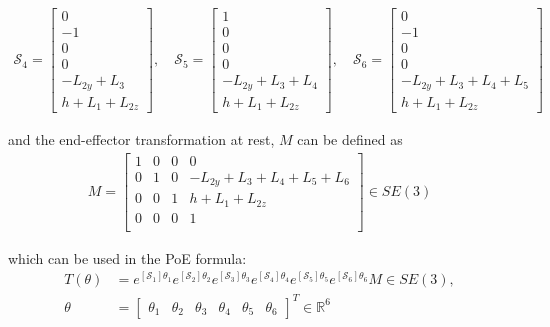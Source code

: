 \documentclass[a4paper,11pt]{article}
\begin{document}
\begin{align*}
    \mathcal{S}_{4} = \begin{bmatrix}
    0 \\ -1 \\ 0 \\ 0 \\ -L_{2y} + L_{3} \\ h + L_{1} + L_{2z}
    \end{bmatrix}, \quad
    \mathcal{S}_{5} = \begin{bmatrix}
    1 \\ 0 \\ 0 \\ 0 \\ -L_{2y} + L_{3} + L_{4} \\ h + L_{1} + L_{2z}
    \end{bmatrix}, \quad
    \mathcal{S}_{6} = \begin{bmatrix}
    0 \\ -1 \\ 0 \\ 0 \\ -L_{2y} + L_{3} + L_{4} + L_{5} \\ h + L_{1} + L_{2z}
    \end{bmatrix}
\end{align*}

and the end-effector transformation at rest, $M$ can be defined as
\begin{align*}
    M = \begin{bmatrix}
        1 & 0 & 0 & 0 \\
        0 & 1 & 0 & -L_{2y} + L_{3} + L_{4} + L_{5} + L_{6} \\
        0 & 0 & 1 & h + L_{1} + L_{2z} \\
        0 & 0 & 0 & 1 \\
    \end{bmatrix} \in SE(3)
\end{align*}

which can be used in the PoE formula:
\begin{align}\label{eq:poe_formula}
    T(\theta) &= 
    e^{\displaystyle [\mathcal{S}_{1}]\theta_{1}}
    e^{\displaystyle [\mathcal{S}_{2}]\theta_{2}}
    e^{\displaystyle [\mathcal{S}_{3}]\theta_{3}}
    e^{\displaystyle [\mathcal{S}_{4}]\theta_{4}}
    e^{\displaystyle [\mathcal{S}_{5}]\theta_{5}}
    e^{\displaystyle [\mathcal{S}_{6}]\theta_{6}}
    M \in SE(3),\\
    \theta &= \begin{bmatrix}
        \theta_{1} & \theta_{2} & \theta_{3} & \theta_{4} & \theta_{5} & \theta_{6} 
    \end{bmatrix}^{T} \in \mathbb{R}^{6} \nonumber
\end{align}
\end{document}

